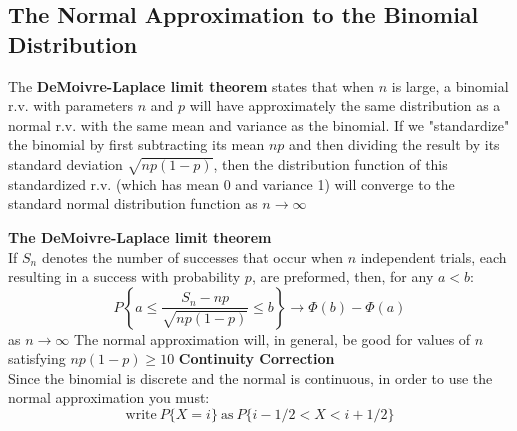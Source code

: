\documentclass[openany]{book}
\numberwithin{equation}{section}
\begin{document}
\begin{flushleft}
\subsection{The Normal Approximation to the Binomial Distribution}
The \textbf{DeMoivre-Laplace limit theorem} states that when $n$ is large, a binomial r.v. with parameters $n$ and $p$ will have approximately the same distribution as a normal r.v. with the same mean and variance as the binomial. \medbreak
If we "standardize" the binomial by first subtracting its mean $np$ and then dividing the result by its standard deviation $\sqrt{np(1-p)}$, then the distribution function of this standardized r.v. (which has mean 0 and variance 1) will converge to the standard normal distribution function as $n \to \infty$\medbreak

\textbf{The DeMoivre-Laplace limit theorem}\\
If $S_n$ denotes the number of successes that occur when $n$ independent trials, each resulting in a success with probability $p$, are preformed, then, for any $a<b$:
\[P\left\{a\leq \frac{S_n-np}{\sqrt{np(1-p)}}\leq b \right\} 
\to \Phi(b)-\Phi(a)
\]
as $n \to \infty$\medbreak
The normal approximation will, in general, be good for values of $n$ satisfying $np(1-p)\geq 10$ \medbreak
\textbf{Continuity Correction}\\
Since the binomial is discrete and the normal is continuous, in order to use the normal approximation you must:
\[\text{write} \ P\{X=i\} \ \text{as} \ P\{i-1/2<X<i+1/2\}\]

\end{flushleft}
\end{document}
